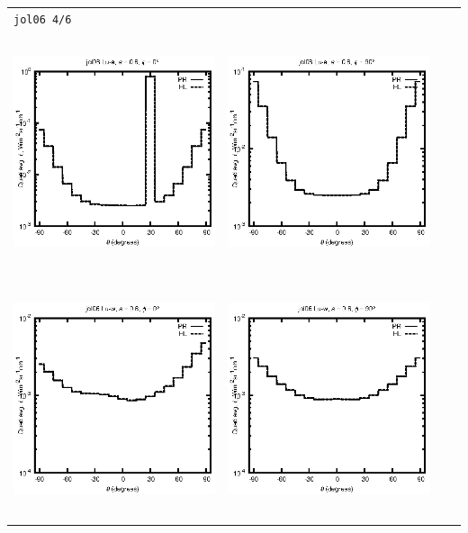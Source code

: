\begin{tabular}{c c c c}
\multicolumn{4}{l}{\texttt{jol06 4/6}} \\
\includegraphics[height=7cm]{../eps/jol06_Lu_a_fwd.eps} &
\includegraphics[height=7cm]{../eps/jol06_Lu_a_cross.eps}\\
\includegraphics[height=7cm]{../eps/jol06_Lu_w_fwd.eps} &
\includegraphics[height=7cm]{../eps/jol06_Lu_w_cross.eps} \\

\end{tabular}
